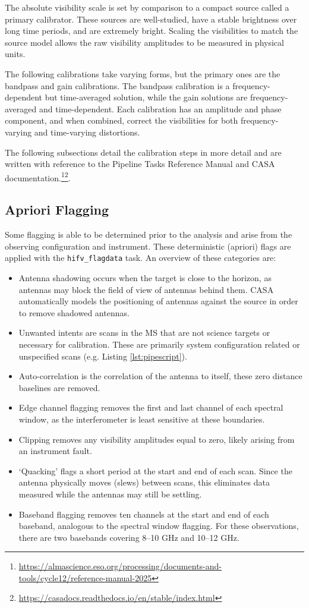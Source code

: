 The absolute visibility scale is set by comparison to a compact source called a primary calibrator. These sources are well-studied, have a stable brightness over long time periods, and are extremely bright. Scaling the visibilities to match the source model allows the raw visibility amplitudes to be measured in physical units. 

The following calibrations take varying forms, but the primary ones are the bandpass and gain calibrations. The bandpass calibration is a frequency-dependent but time-averaged solution, while the gain solutions are frequency-averaged and time-dependent. Each calibration has an amplitude and phase component, and when combined, correct the visibilities for both frequency-varying and time-varying distortions.

The following subsections detail the calibration steps in more detail and are written with reference to the Pipeline Tasks Reference Manual and CASA documentation.\footnote{\url{https://almascience.eso.org/processing/documents-and-tools/cycle12/reference-manual-2025}}\footnote{\url{https://casadocs.readthedocs.io/en/stable/index.html}}.

\subsection{Apriori Flagging}
Some flagging is able to be determined prior to the analysis and arise from the observing configuration and instrument. These deterministic (apriori) flags are applied with the \texttt{hifv\_flagdata} task. An overview of these categories are:
\begin{itemize}
    \item Antenna shadowing occurs when the target is close to the horizon, as antennas may block the field of view of antennas behind them. CASA automatically models the positioning of antennas against the source in order to remove shadowed antennas.
    \item Unwanted intents are scans in the MS that are not science targets or necessary for calibration. These are primarily system configuration related or unspecified scans (e.g. Listing \ref{lst:pipescript}).
    \item Auto-correlation is the correlation of the antenna to itself, these zero distance baselines are removed.
    \item Edge channel flagging removes the first and last channel of each spectral window, as the interferometer is least sensitive at these boundaries.
    \item Clipping removes any visibility amplitudes equal to zero, likely arising from an instrument fault.
    \item `Quacking' flags a short period at the start and end of each scan. Since the antenna physically moves (slews) between scans, this eliminates data measured while the antennas may still be settling.
    \item Baseband flagging removes ten channels at the start and end of each baseband, analogous to the spectral window flagging. For these observations, there are two basebands covering 8--10 GHz and 10--12 GHz. 
\end{itemize}

